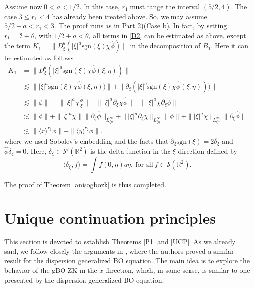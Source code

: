 \documentclass[reqno]{amsart}
\newcommand{\ha}{\hat{\phi}}
\newcommand{\les}{\lesssim}
\newcommand{\lanx}{\langle x \rangle}
\newcommand{\lany}{\langle y \rangle}
\newcommand{\R}{\mathbb R}
\newcommand{\p}{\partial}
\newcommand{\sgn}{\text{sgn}}
\numberwithin{equation}{section}
\begin{document}
Assume now $0<a<1/2$. In this case, $r_1$ must range the interval $(5/2,4)$. The case $3\leq r_1<4$ has already been treated above. So, we may assume  $5/2+a<r_1<3$. The proof runs as in Part 2)(Case b). In fact, by setting $r_1=2+\theta$, with $1/2+a<\theta$, all terms in \eqref{D2} can be estimated as above, except the term $K_1=\|D^{\theta}_\xi (|\xi|^{a}\sgn(\xi)\chi \ha)\|$ in the decomposition of  $B_1$. Here it can be estimated as follows
\begin{equation*}
\begin{split}
K_1&=\|D^{\theta}_\xi (|\xi|^{a}\sgn(\xi)\chi\ha(\xi,\eta))\|\\
&\les \||\xi|^{a}\sgn(\xi)\chi\ha(\xi,\eta))\|+\|\p_\xi (|\xi|^{a}\sgn(\xi)\chi\ha(\xi,\eta)))\|\\
&\les \|\phi\|+\Big\||\xi|^a \chi \frac{\ha}{\xi}\Big\|+\||\xi|^a \p_\xi \chi \ha \|+\||\xi|^a \chi \p_\xi \ha\|\\
&\les \|\phi\|+\||\xi|^a \chi\|\|\p_\xi \ha\|_{L^\infty_{\xi \eta}}+\||\xi|^a \p_\xi \chi\|_{L^\infty_{\xi \eta}}\|\phi\|+\||\xi|^a \chi\|_{L^\infty_{\xi \eta}}\|\p_\xi \ha\|\\
&\les \|\lanx^{r_1}\phi\|+\|\lany^{r_2}\phi\|,
\end{split}
\end{equation*}
where we used Sobolev's embedding and the facts that $\p_\xi \sgn(\xi)=2\delta_\xi$ and $\ha\delta_\xi=0$. Here, $\delta_\xi \in \mathcal{S}'(\R^2)$ is the delta function in the $\xi$-direction defined by
\begin{equation*}
\langle \delta_\xi, f \rangle=\int f(0,\eta)d\eta, \ \mbox{for all} \ f\in \mathcal{S}(\R^2).
\end{equation*}


The proof of Theorem \ref{anisogbozk} is thus completed.


\section{Unique continuation principles} \label{uniquep}


This section is devoted to establish Theorems \ref{P1} and \ref{UCP}. As we already said, we
follow closely the arguments in \cite{FLP1}, where the authors proved a similar result for the dispersion generalized BO equation. The main idea is
to explore the behavior of the gBO-ZK in the $x$-direction, which, in some
sense, is similar to one presented by the dispersion generalized BO equation.
\end{document}
